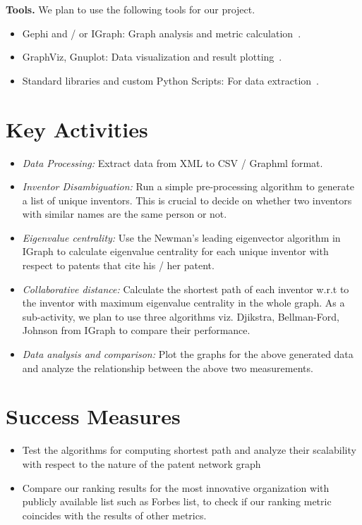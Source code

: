 \documentclass[11pt]{article}
\renewcommand{\paragraph}{\vspace{3pt}\noindent\textbf}
\newcommand{\squish}{
  \setlength{\topsep}{0pt}
  \setlength{\itemsep}{0ex}
  \setlength{\parskip}{0pt}
}
\begin{document}
\paragraph{Tools.}
We plan to use the following tools for our project.
\begin{itemize}
\item Gephi and / or IGraph: Graph analysis and metric calculation~\cite{gephi, igraph}.
\item GraphViz, Gnuplot: Data visualization and result plotting~\cite{graphviz, gnuplot}.
\item Standard libraries and custom Python Scripts: For data extraction~\cite{python}.
\end{itemize}

\section{Key Activities}
\begin{itemize}
\item {\em Data Processing:} Extract data from XML to CSV / Graphml format.
\item {\em Inventor Disambiguation:} Run a simple pre-processing algorithm to generate a list of unique inventors.  This is crucial to decide on whether two inventors with similar names are the same person or not.
\item {\em Eigenvalue centrality:} Use the Newman's leading eigenvector algorithm in IGraph to calculate eigenvalue centrality for each unique inventor with respect to patents that cite his / her patent.
\item {\em Collaborative distance:} Calculate the shortest path of each inventor w.r.t to the inventor with maximum eigenvalue centrality in the whole graph. As a sub-activity, we plan to use three algorithms viz. Djikstra, Bellman-Ford, Johnson from IGraph to compare their performance.
\item {\em Data analysis and comparison:} Plot the graphs for the above generated data and analyze the relationship between the above two measurements.
\end{itemize}

\section{Success Measures} %
\begin{itemize}
\item Test the algorithms for computing shortest path and analyze their scalability with respect to the nature of the patent network graph
\item Compare our ranking results for the most innovative organization with publicly available list such as Forbes list, to check if our ranking metric coincides with the results of other metrics.
\end{itemize}
\end{document}
